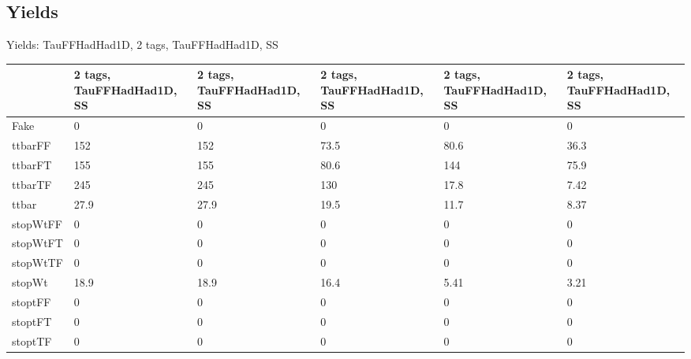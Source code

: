 
\subsection{Yields}

\begin{frame}{Yields: TauFFHadHad1D, 2 tags, TauFFHadHad1D, SS}
\begin{center}
  \begin{tabular}{l| >{\centering\let\newline\\\arraybackslash\hspace{0pt}}m{1.4cm}| >{\centering\let\newline\\\arraybackslash\hspace{0pt}}m{1.4cm}| >{\centering\let\newline\\\arraybackslash\hspace{0pt}}m{1.4cm}| >{\centering\let\newline\\\arraybackslash\hspace{0pt}}m{1.4cm}| >{\centering\let\newline\\\arraybackslash\hspace{0pt}}m{1.4cm}}
    & 2 tags, TauFFHadHad1D, SS & 2 tags, TauFFHadHad1D, SS & 2 tags, TauFFHadHad1D, SS & 2 tags, TauFFHadHad1D, SS & 2 tags, TauFFHadHad1D, SS \\
 \hline \hline
    Fake& 0 & 0 & 0 & 0 & 0 \\
 \hline
    ttbarFF& 152 & 152 & 73.5 & 80.6 & 36.3 \\
 \hline
    ttbarFT& 155 & 155 & 80.6 & 144 & 75.9 \\
 \hline
    ttbarTF& 245 & 245 & 130 & 17.8 & 7.42 \\
 \hline
    ttbar& 27.9 & 27.9 & 19.5 & 11.7 & 8.37 \\
 \hline
    stopWtFF& 0 & 0 & 0 & 0 & 0 \\
 \hline
    stopWtFT& 0 & 0 & 0 & 0 & 0 \\
 \hline
    stopWtTF& 0 & 0 & 0 & 0 & 0 \\
 \hline
    stopWt& 18.9 & 18.9 & 16.4 & 5.41 & 3.21 \\
 \hline
    stoptFF& 0 & 0 & 0 & 0 & 0 \\
 \hline
    stoptFT& 0 & 0 & 0 & 0 & 0 \\
 \hline
    stoptTF& 0 & 0 & 0 & 0 & 0 \\

\end{tabular}
\end{center}
\end{frame}
